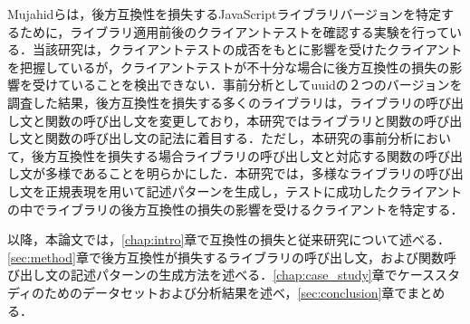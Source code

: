 \documentclass[T,J]{fose} %
\begin{document}
Mujahidらは，後方互換性を損失するJavaScriptライブラリバージョンを特定するために，ライブラリ適用前後のクライアントテストを確認する実験を行っている\cite{mujahid}．当該研究は，クライアントテストの成否をもとに影響を受けたクライアントを把握しているが，クライアントテストが不十分な場合に後方互換性の損失の影響を受けていることを検出できない．事前分析としてuuidの２つのバージョンを調査した結果，後方互換性を損失する多くのライブラリは，ライブラリの呼び出し文と関数の呼び出し文を変更しており，本研究ではライブラリと関数の呼び出し文と関数の呼び出し文の記法に着目する．ただし，本研究の事前分析において，後方互換性を損失する場合ライブラリの呼び出し文と対応する関数の呼び出し文が多様であることを明らかにした．本研究では，多様なライブラリの呼び出し文を正規表現を用いて記述パターンを生成し，テストに成功したクライアントの中でライブラリの後方互換性の損失の影響を受けるクライアントを特定する．


以降，本論文では，\ref{chap:intro}章で互換性の損失と従来研究について述べる．\ref{sec:method}章で後方互換性が損失するライブラリの呼び出し文，および関数呼び出し文の記述パターンの生成方法を述べる．\ref{chap:case_study}章でケーススタディのためのデータセットおよび分析結果を述べ，\ref{sec:conclusion}章でまとめる．






\end{document}
